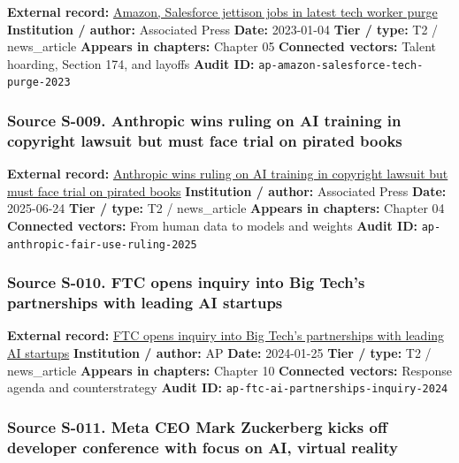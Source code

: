 \documentclass[
  american,
  11pt,
  letterpaper,
]{article}
\begin{document}
\textbf{External record:}
\href{https://apnews.com/article/bbb2f3a09eafdfc7cda54a3b87e538ad}{Amazon,
Salesforce jettison jobs in latest tech worker purge}
\textbf{Institution / author:} Associated Press \textbf{Date:}
2023-01-04 \textbf{Tier / type:} T2 / news\_article \textbf{Appears in
chapters:} Chapter 05 \textbf{Connected vectors:} Talent hoarding,
Section 174, and layoffs \textbf{Audit ID:}
\texttt{ap-amazon-salesforce-tech-purge-2023}

\subsubsection{Source S-009. Anthropic wins ruling on AI training in
copyright lawsuit but must face trial on pirated
books}\label{source-s-009-anthropic-wins-ruling-on-ai-training-in-copyright-lawsuit-but-must-face-trial-on-pirated-books}

\textbf{External record:}
\href{https://apnews.com/article/1e5cece51c2e4bd0bb21d94de2abb035}{Anthropic
wins ruling on AI training in copyright lawsuit but must face trial on
pirated books} \textbf{Institution / author:} Associated Press
\textbf{Date:} 2025-06-24 \textbf{Tier / type:} T2 / news\_article
\textbf{Appears in chapters:} Chapter 04 \textbf{Connected vectors:}
From human data to models and weights \textbf{Audit ID:}
\texttt{ap-anthropic-fair-use-ruling-2025}

\subsubsection{Source S-010. FTC opens inquiry into Big Tech's
partnerships with leading AI
startups}\label{source-s-010-ftc-opens-inquiry-into-big-tech-s-partnerships-with-leading-ai-startups}

\textbf{External record:}
\href{https://apnews.com/article/67feef411ef311f0be543f546ef34b3d}{FTC
opens inquiry into Big Tech's partnerships with leading AI startups}
\textbf{Institution / author:} AP \textbf{Date:} 2024-01-25 \textbf{Tier
/ type:} T2 / news\_article \textbf{Appears in chapters:} Chapter 10
\textbf{Connected vectors:} Response agenda and counterstrategy
\textbf{Audit ID:} \texttt{ap-ftc-ai-partnerships-inquiry-2024}

\subsubsection{Source S-011. Meta CEO Mark Zuckerberg kicks off
developer conference with focus on AI, virtual
reality}\label{source-s-011-meta-ceo-mark-zuckerberg-kicks-off-developer-conference-with-focus-on-ai-virtual-reality}
\end{document}
